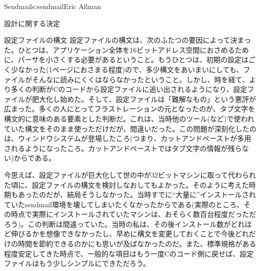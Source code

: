 \begin{aosachapter}{Sendmail}{s:sendmail}{Eric Allman}
\begin{aosasect1}{設計に関する決定}
\begin{aosasect2}{設定ファイルの構文}
設定ファイルの構文は、次のふたつの要因によって決まった。ひとつは、アプリケーション全体を16ビットアドレス空間におさめるために、パーサを小さくする必要があるということ。もうひとつは、初期の設定はごく少なかった(1ページにおさまる程度)ので、多少構文をあいまいにしても、ファイルがそんなに読みにくくはならなかったということ。しかし、時を経て、より多くの判断がCのコードから設定ファイルに追い出されるようになり、設定ファイルが肥大化し始めた。そして、設定ファイルは「難解なもの」という悪評が広まった。多くの人にとってフラストレーションの元となったのが、タブ文字を構文的に意味のある要素とした判断だ。これは、当時他のツール(など)で使われていた構文をそのまま使っただけだが、間違いだった。この問題が深刻化したのは、ウィンドウシステムが登場したころ(つまり、カットアンドペーストが多用されるようになったころ。カットアンドペーストではタブ文字の情報が残らない)からである。

今思えば、設定ファイルが巨大化して世の中が32ビットマシンに取って代わられた頃に、設定ファイルの構文を検討しなおしてもよかった。そのように考えた時期もあったのだが、結局そうしなかった。当時すでに``大量に''インストールされていたsendmail環境を壊してしまいたくなかったからである(実際のところ、その時点で実際にインストールされていたマシンは、おそらく数百台程度だっただろう)。この判断は間違っていた。当時の私は、その後インストール数がどれほど伸びるかを想像できなかったし、早めに構文を変更しておくことで今後どれだけの時間を節約できるのかにも思いが及ばなかったのだ。また、標準規格がある程度安定してきた時点で、一般的な項目はもう一度Cのコード側に戻せば、設定ファイルはもう少しシンプルにできただろう。


\end{aosasect2}
\end{aosasect1}
\end{aosachapter}
